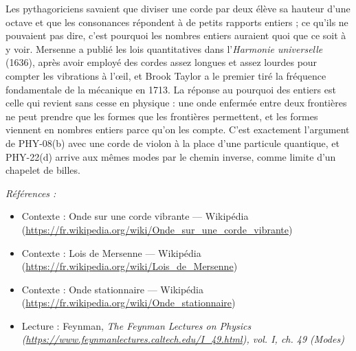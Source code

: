 \documentclass[11pt]{article}
\newenvironment{refs}{\par\small\noindent\emph{Références :}\begin{itemize}\setlength\itemsep{0pt}}{\end{itemize}\normalsize}
\begin{document}
\noindent Les pythagoriciens savaient que diviser une corde par deux élève sa hauteur
d'une octave et que les consonances répondent à de petits rapports entiers ; ce qu'ils ne
pouvaient pas dire, c'est pourquoi les nombres entiers auraient quoi que ce soit à y voir.
Mersenne a publié les lois quantitatives dans l'\textit{Harmonie universelle} (1636), après avoir
employé des cordes assez longues et assez lourdes pour compter les vibrations à l'\oe{}il, et Brook
Taylor a le premier tiré la fréquence fondamentale de la mécanique en 1713. La réponse au
\og{} pourquoi des entiers \fg{} est celle qui revient sans cesse en physique : une onde enfermée entre
deux frontières ne peut prendre que les formes que les frontières permettent, et les formes
viennent en nombres entiers parce qu'on les compte. C'est exactement l'argument de PHY-08(b) avec
une corde de violon à la place d'une particule quantique, et PHY-22(d) arrive aux mêmes modes par
le chemin inverse, comme limite d'un chapelet de billes.

\begin{refs}
\item Contexte : Onde sur une corde vibrante --- Wikipédia (\url{https://fr.wikipedia.org/wiki/Onde_sur_une_corde_vibrante})
\item Contexte : Lois de Mersenne --- Wikipédia (\url{https://fr.wikipedia.org/wiki/Lois_de_Mersenne})
\item Contexte : Onde stationnaire --- Wikipédia (\url{https://fr.wikipedia.org/wiki/Onde_stationnaire})
\item Lecture : Feynman, \textit{The Feynman Lectures on Physics (\url{https://www.feynmanlectures.caltech.edu/I_49.html}), vol. I, ch. 49 (Modes)}
\end{refs}

\bigskip
\end{document}

